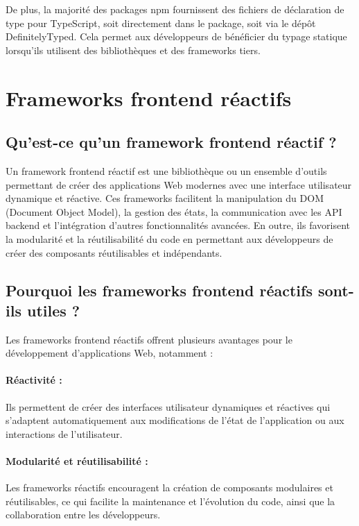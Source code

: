 De plus, la majorité des packages npm fournissent des fichiers de déclaration de type pour TypeScript, soit directement dans le package, soit via le dépôt DefinitelyTyped. Cela permet aux développeurs de bénéficier du typage statique lorsqu'ils utilisent des bibliothèques et des frameworks tiers.

\section{Frameworks frontend réactifs}

\subsection{Qu'est-ce qu'un framework frontend réactif ?}

Un framework frontend réactif est une bibliothèque ou un ensemble d'outils permettant de créer des applications Web modernes avec une interface utilisateur dynamique et réactive. Ces frameworks facilitent la manipulation du DOM (Document Object Model), la gestion des états, la communication avec les API backend et l'intégration d'autres fonctionnalités avancées. En outre, ils favorisent la modularité et la réutilisabilité du code en permettant aux développeurs de créer des composants réutilisables et indépendants.

\subsection{Pourquoi les frameworks frontend réactifs sont-ils utiles ?}

Les frameworks frontend réactifs offrent plusieurs avantages pour le développement d'applications Web, notamment :

\paragraph{Réactivité :} Ils permettent de créer des interfaces utilisateur dynamiques et réactives qui s'adaptent automatiquement aux modifications de l'état de l'application ou aux interactions de l'utilisateur.
\paragraph{Modularité et réutilisabilité :} Les frameworks réactifs encouragent la création de composants modulaires et réutilisables, ce qui facilite la maintenance et l'évolution du code, ainsi que la collaboration entre les développeurs.
